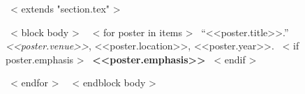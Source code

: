 ~< extends "section.tex" >~

~< block body >~
  ~< for poster in items >~
    ``<<poster.title>>.'' {\it <<poster.venue>>}, <<poster.location>>, <<poster.year>>.
    ~< if poster.emphasis >~
      {\bf <<poster.emphasis>>}
    ~< endif >~

  ~< endfor >~
~< endblock body >~